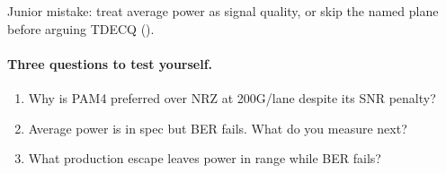 
Junior mistake: treat average power as signal quality, or skip the named plane
before arguing TDECQ ().

\paragraph{Three questions to test yourself.}
\begin{enumerate}
\item Why is PAM4 preferred over NRZ at 200G/lane despite its SNR penalty?
\item Average power is in spec but BER fails. What do you measure next?
\item What production escape leaves power in range while BER fails?
\end{enumerate}

